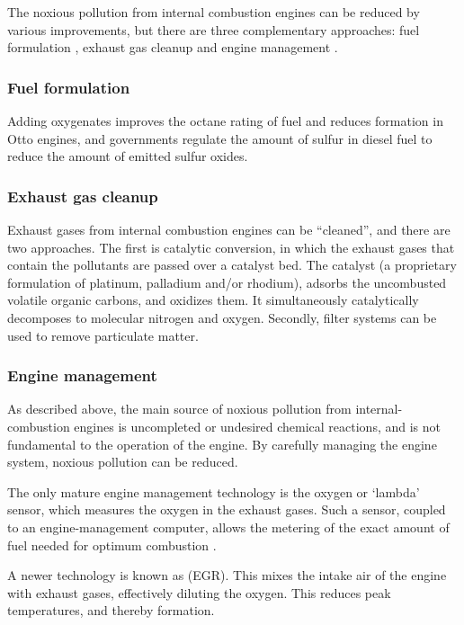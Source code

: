 The noxious pollution from internal combustion engines can be reduced by various
improvements, but there are three complementary approaches: fuel formulation
\autocite{Gertler1999}, exhaust gas cleanup \autocite{Braun2018} and engine
management \autocite{Reif2015}.

\subsubsection{Fuel formulation}
\label{sec:FuelFormulation}

Adding oxygenates improves the octane rating of fuel and reduces \nox formation
in Otto engines, and governments regulate the amount of sulfur in diesel fuel to
reduce the amount of emitted sulfur oxides.

\subsubsection{Exhaust gas cleanup} \label{par:cleanup}

Exhaust gases from internal combustion engines can be ``cleaned'', and there are
two approaches. The first is catalytic conversion, in which the exhaust gases
that contain the pollutants are passed over a catalyst bed. The catalyst (a
proprietary formulation of platinum, palladium and/or rhodium), adsorbs the
uncombusted volatile organic carbons, and oxidizes them. It simultaneously
catalytically decomposes \nox to molecular nitrogen and oxygen. Secondly, filter
systems can be used to remove particulate matter.

\subsubsection{Engine management} \label{par:engine-management}

As described above, the main source of noxious pollution from
internal\hyp{}combustion engines is uncompleted or undesired chemical reactions,
and is not fundamental to the operation of the engine. By carefully managing the
engine system, noxious pollution can be reduced. 

The only mature engine management technology is the oxygen or `lambda' sensor,
which measures the oxygen in the exhaust gases. Such a sensor, coupled to an
engine-management computer, allows the me\-ter\-ing of the exact amount of fuel
need\-ed for op\-ti\-mum combustion \autocite{Frauhammer2014}.

A newer technology is known as  (EGR). This
mixes the intake air of the engine with exhaust gases, effectively diluting the
oxygen. This reduces peak temperatures, and thereby \nox formation.

